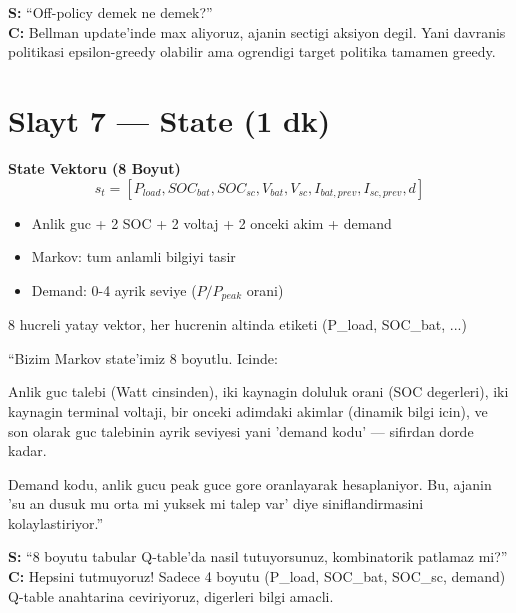 \documentclass[11pt,a4paper]{article}
\begin{document}
\begin{soruboks}
\textbf{S:} ``Off-policy demek ne demek?''\\
\textbf{C:} Bellman update'inde max aliyoruz, ajanin sectigi aksiyon degil. Yani davranis politikasi epsilon-greedy olabilir ama ogrendigi target politika tamamen greedy.
\end{soruboks}

\section{Slayt 7 --- State (1 dk)}

\begin{slytboks}
\textbf{State Vektoru (8 Boyut)}
\[ s_t = [P_{load}, SOC_{bat}, SOC_{sc}, V_{bat}, V_{sc}, I_{bat,prev}, I_{sc,prev}, d] \]
\begin{itemize}
\item Anlik guc + 2 SOC + 2 voltaj + 2 onceki akim + demand
\item Markov: tum anlamli bilgiyi tasir
\item Demand: 0-4 ayrik seviye ($P/P_{peak}$ orani)
\end{itemize}
\end{slytboks}

\begin{gorselboks}
8 hucreli yatay vektor, her hucrenin altinda etiketi (P\_load, SOC\_bat, ...)
\end{gorselboks}

\begin{sayboks}
``Bizim Markov state'imiz 8 boyutlu. Icinde:

Anlik guc talebi (Watt cinsinden), iki kaynagin doluluk orani (SOC degerleri), iki kaynagin terminal voltaji, bir onceki adimdaki akimlar (dinamik bilgi icin), ve son olarak guc talebinin ayrik seviyesi yani 'demand kodu' --- sifirdan dorde kadar.

Demand kodu, anlik gucu peak guce gore oranlayarak hesaplaniyor. Bu, ajanin 'su an dusuk mu orta mi yuksek mi talep var' diye siniflandirmasini kolaylastiriyor.''
\end{sayboks}

\begin{soruboks}
\textbf{S:} ``8 boyutu tabular Q-table'da nasil tutuyorsunuz, kombinatorik patlamaz mi?''\\
\textbf{C:} Hepsini tutmuyoruz! Sadece 4 boyutu (P\_load, SOC\_bat, SOC\_sc, demand) Q-table anahtarina ceviriyoruz, digerleri bilgi amacli.
\end{soruboks}
\end{document}
